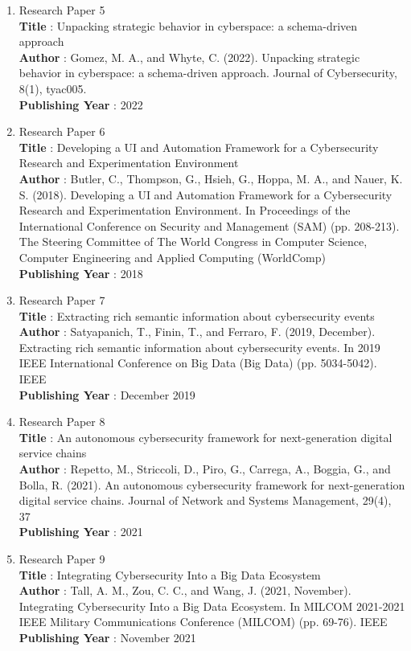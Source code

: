 \begin{enumerate}
\item Research Paper 5 
\\ \textbf{Title} : Unpacking strategic behavior in cyberspace: a schema-driven approach
\\ \textbf{Author} : Gomez, M. A., and Whyte, C. (2022). Unpacking strategic behavior in cyberspace: a
schema-driven approach. Journal of Cybersecurity, 8(1), tyac005.
\\ \textbf{Publishing Year} : 2022

\item Research Paper 6 
\\ \textbf{Title} : Developing a UI and Automation Framework for a Cybersecurity Research and
Experimentation Environment
\\ \textbf{Author} : Butler, C., Thompson, G., Hsieh, G., Hoppa, M. A., and Nauer, K. S. (2018). Developing
a UI and Automation Framework for a Cybersecurity Research and Experimentation Environment.
In Proceedings of the International Conference on Security and Management (SAM) (pp. 208-213).
The Steering Committee of The World Congress in Computer Science, Computer Engineering and
Applied Computing (WorldComp)
\\ \textbf{Publishing Year} : 2018

\item Research Paper 7 
\\ \textbf{Title} : Extracting rich semantic information about cybersecurity events
\\ \textbf{Author} : Satyapanich, T., Finin, T., and Ferraro, F. (2019, December). Extracting rich semantic
information about cybersecurity events. In 2019 IEEE International Conference on Big Data (Big
Data) (pp. 5034-5042). IEEE
\\ \textbf{Publishing Year} : December 2019

\newpage
\item Research Paper 8 
\\ \textbf{Title} : An autonomous cybersecurity framework for next-generation digital service chains
\\ \textbf{Author} : Repetto, M., Striccoli, D., Piro, G., Carrega, A., Boggia, G., and Bolla, R. (2021). An
autonomous cybersecurity framework for next-generation digital service chains. Journal of
Network and Systems Management, 29(4), 37
\\ \textbf{Publishing Year} : 2021

\item Research Paper 9 
\\ \textbf{Title} :  Integrating Cybersecurity Into a Big Data Ecosystem
\\ \textbf{Author} : Tall, A. M., Zou, C. C., and Wang, J. (2021, November). Integrating Cybersecurity Into a
Big Data Ecosystem. In MILCOM 2021-2021 IEEE Military Communications Conference
(MILCOM) (pp. 69-76). IEEE
\\ \textbf{Publishing Year} : November 2021


\end{enumerate}
